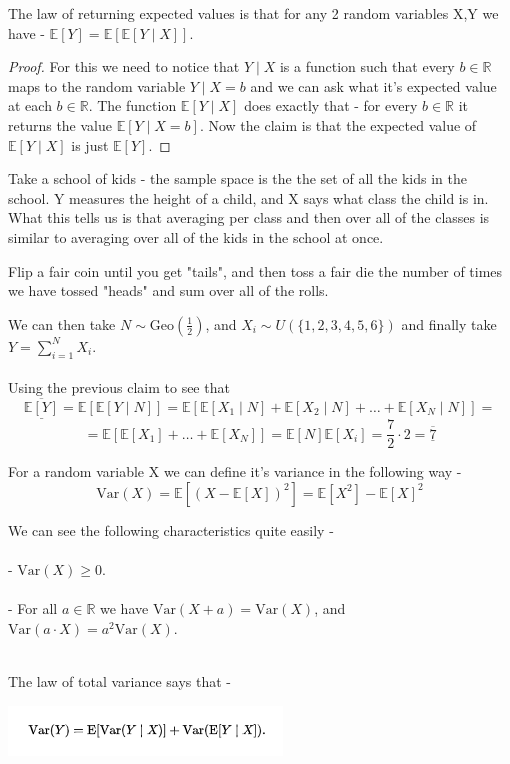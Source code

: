 \documentclass[../main.tex]{subfiles}
\begin{document}
\begin{claim} 
The law of returning expected values is that for any 2 random variables X,Y we have - $\mathbb{E}[Y]=\mathbb{E}[\mathbb{E}[Y\mid X]]$. \end{claim}
\begin{proof}
For this we need to notice that $Y\mid X$ is a function such that every $b\in\mathbb{R}$ maps to the random variable $Y\mid X=b$ and we can ask what it's expected value at each $b\in\mathbb{R}$. The function $\mathbb{E}[Y\mid X]$ does exactly that - for every $b\in\mathbb{R}$ it returns the value $\mathbb{E}[Y\mid X=b]$. Now the claim is that the expected value of $\mathbb{E}[Y\mid X]$ is just $\mathbb{E}[Y]$. 
\end{proof}
\newpage 
\begin{example} Take a school of kids - the sample space is
the the set of all the kids in the school. Y measures the height of a child, and X says what class the child is in. What this tells us is that averaging per class and then over all of the classes is similar to averaging over all of the kids in the school at once. \end{example}
\begin{example} Flip a fair coin until you get "tails", and then toss a fair die the number of times we have tossed "heads" and sum over all of the rolls. \end{example}
We can then take $N\sim\text{Geo}(\frac{1}{2})$, and $X_i\sim U(\{1,2,3,4,5,6\})$ and finally take $Y=\sum_{i=1}^N X_i$. \\\\ Using the previous claim to see that
\[
    \overline{\underline{\mathbb{E}[Y]}} = \mathbb{E}[\mathbb{E}[Y\mid N]] = \mathbb{E}[\mathbb{E}[X_1 \mid N]+\mathbb{E}[X_2 \mid N]+\dots + \mathbb{E}[X_N \mid N]] = 
\]
\[
    =\mathbb{E}[\mathbb{E}[X_1]+\dots+\mathbb{E}[X_N]] = \mathbb{E}[N]\mathbb{E}[X_i] = \frac{7}{2}\cdot 2 = \overline{\underline{7}}
\]
\begin{definition} For a random variable X we can define it's variance in the following way -
\[
    \text{Var}(X) = \mathbb{E}[(X-\mathbb{E}[X])^2] = \mathbb{E}[X^2]-\mathbb{E}[X]^2 
\]
\end{definition}
We can see the following characteristics quite easily - \\\\
- $\text{Var}(X)\geq 0$. \\\\
- For all $a\in\mathbb{R}$ we have $\text{Var}(X+a)=\text{Var}(X)$, and $\text{Var}(a\cdot X)=a^2 \text{Var}(X)$. \\\\
\begin{claim} The law of total variance says that -
\begin{center}
\includegraphics{images/Stat_Theory_Fourth_Image.png}
\end{center}
\end{claim}
\newpage
\end{document}
